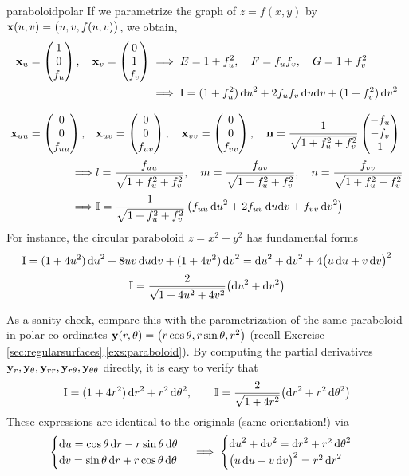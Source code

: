 \begin{example}{}{paraboloidpolar}
If we parametrize the graph of $z=f(x,y)$ by ${\mathbf{x}}(u,v)=\bigl(u,v,f(u,v)\bigr)$, we obtain,
\begin{gather*}
\begin{aligned}
{\mathbf{x}}_u=\begin{pmatrix}1\\0\\f_u\end{pmatrix},\quad{\mathbf{x}}_v=\begin{pmatrix}0\\1\\f_v\end{pmatrix}&\implies E=1+f_u^2,\quad F=f_uf_v,\quad G=1+f_v^2\\
&\implies \mathrm{I}=(1+f_u^2)\,{\mathrm{d} u}^2+2f_uf_v\,{\mathrm{d} u}{\mathrm{d} v}+(1+f_v^2)\,{\mathrm{d} v}^2
\end{aligned}\\[8pt]
\begin{aligned}
{\mathbf{x}}_{uu}=\begin{pmatrix}0\\0\\f_{uu}\end{pmatrix},\quad&{\mathbf{x}}_{uv}=\begin{pmatrix}0\\0\\f_{uv}\end{pmatrix},\quad{\mathbf{x}}_{vv}=\begin{pmatrix}0\\0\\f_{vv}\end{pmatrix},\quad {\mathbf{n}}=\frac{1}{\sqrt{1+f_u^2+f_v^2}}\begin{pmatrix}-f_u\\-f_v\\1\end{pmatrix}\\[2pt]
\implies &l=\frac{f_{uu}}{\sqrt{1+f_u^2+f_v^2}},\quad m=\frac{f_{uv}}{\sqrt{1+f_u^2+f_v^2}},\quad n=\frac{f_{vv}}{\sqrt{1+f_u^2+f_v^2}}\\[2pt]
\implies &\mathbb{I}=\frac{1}{\sqrt{1+f_u^2+f_v^2}}\left(f_{uu}\,{\mathrm{d} u}^2+2f_{uv}\,{\mathrm{d} u}{\mathrm{d} v}+
f_{vv}\,{\mathrm{d} v}^2\right)
\end{aligned}
\end{gather*}
For instance, the circular paraboloid $z=x^2+y^2$ has fundamental forms
\begin{gather*}
\mathrm{I}=(1+4u^2)\,{\mathrm{d} u}^2+8uv\,{\mathrm{d} u}{\mathrm{d} v}+(1+4v^2)\,{\mathrm{d} v}^2 ={\mathrm{d} u}^2+{\mathrm{d} v}^2+4\bigl(u\,{\mathrm{d} u}+v\,{\mathrm{d} v}\bigr)^2\\[2pt]
\mathbb{I}=\frac{2}{\sqrt{1+4u^2+4v^2}}\bigl({\mathrm{d} u}^2+{\mathrm{d} v}^2\bigr)
\end{gather*}


As a sanity check, compare this with the parametrization of the same paraboloid in polar co-ordinates ${\mathbf{y}}(r,\theta)=\bigl(r\cos\theta,r\sin\theta,r^2\big)$ (recall Exercise \ref*{sec:regularsurfaces}.\ref{exs:paraboloid}). By computing the partial derivatives ${\mathbf{y}}_r,{\mathbf{y}}_\theta,{\mathbf{y}}_{rr},{\mathbf{y}}_{r\theta},{\mathbf{y}}_{\theta\theta}$ directly, it is easy to verify that
	\begin{gather*}
	\mathrm{I}=(1+4r^2)\,{\mathrm{d} r}^2+r^2\,{\mathrm{d}\theta}^2,\qquad\mathbb{I}=\frac{2}{\sqrt{1+4r^2}}\big({\mathrm{d} r}^2+r^2\,{\mathrm{d}\theta}^2\bigr)
	\end{gather*}
	These expressions are identical to the originals (same orientation!) via
	\[
	\begin{cases}
	{\mathrm{d}u}=\cos\theta\,{\mathrm{d} r}-r\sin\theta\,{\mathrm{d}\theta}\\
	{\mathrm{d} v}=\sin\theta\,{\mathrm{d} r}+r\cos\theta\,{\mathrm{d}\theta}
	\end{cases}
	\implies
	\begin{cases}
	{\mathrm{d}u}^2+{\mathrm{d} v}^2={\mathrm{d} r}^2+r^2\,{\mathrm{d}\theta}^2\\
	\bigl(u\,{\mathrm{d} u}+v\,{\mathrm{d} v}\bigr)^2=r^2\,{\mathrm{d} r}^2\\
	\end{cases} 
  \]
\end{example}


